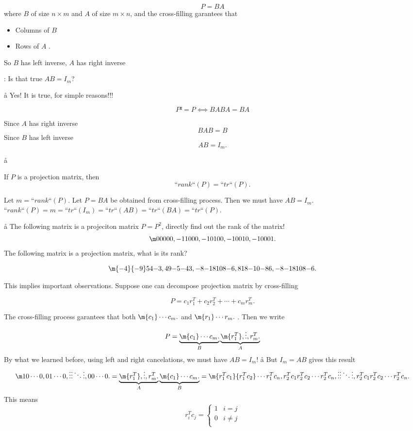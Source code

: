 $$
P = BA
$$
where $B$ of size $n × m$ and $A$ of size $m × n$, and the cross-filling garantees that

\begin{itemize}
\item Columns of $B$ \li
\item Rows of $A$ \li.
\end{itemize}

So $B$ has {\color{red}left inverse}, $A$ has {\color{blue}right inverse}

\vfill
{}: Is that true $AB=I_m$?

\a\aa
Yes! It is true, for simple reasons!!!

$$
P² = P ⟺  BABA = BA
$$

Since $A$ has right inverse
$$
BAB=B
$$
Since $B$ has left inverse
$$
AB = I_m.
$$

\a\aa

\begin{prop}
If $P$ is a projection matrix, then 
$$
“rank“(P) = “tr“(P).
$$
\end{prop}
Let $m=“rank“(P)$. Let $P=BA$ be obtained from cross-filling process. Then we must have $AB = I_m$.
\vfill
$“rank“(P)=m=“tr“(I_m)=“tr“(AB)=“tr“(BA)=“tr“(P)$.

\a\aa
\exe The following matrix is a projeciton matrix $P=P^2$, directly find out the rank of the matrix!
$$
\m00000,
{-1}1000,
{-1}0100,
{-1}0010,
{-1}0001.
$$
\exe The following matrix is a projection matrix, what is its rank?

$$
\m
{-4}{-9}54{-3},
49{-5}{-4}3,
{-8}{-18}{10}8{-6},
8{18}{-10}{-8}6,
{-8}{-18}{10}8{-6}.
$$
\aaa



This implies important observations.
Suppose one can decompose projection matrix by cross-filling

$$
P = c_1r_1^T + c_2r_2^T + \cdots +c_mr_m^T.
$$

The cross-filling process garantees that both $\m{c_1}\cdots{c_m}.$ and $\m{r_1}\cdots{r_m}.$ \li. Then we write

$$
P = \underbrace{\m{c_1}\cdots{c_m}.}_B\underbrace{\m{r_1^T},\vdots,{r_m^T}.}_A
$$
By what we learned before, using left and right cancelations, we must have $AB = I_m$!
\a\aa
But $I_m=AB$ gives this result
$$
\m 
10\cdots0,
01\cdots0,
\vdots\vdots\ddots\vdots,
00\cdots0.
=
\underbrace{\m{r_1^T},\vdots,{r_m^T}.}_A\underbrace{\m{c_1}\cdots{c_m}.}_B
=
\m
{r_1^Tc_1}{r_1^Tc_2}\cdots{r_1^Tc_n},
{r_2^Tc_1}{r_2^Tc_2}\cdots{r_2^Tc_n},
\vdots\vdots\ddots\vdots,
{r_2^Tc_1}{r_2^Tc_2}\cdots{r_2^Tc_n}.
$$
This means
$$
r_i^Tc_j = \begin{cases}
1& i=j\\
0& i≠j\\
\end{cases}
$$


